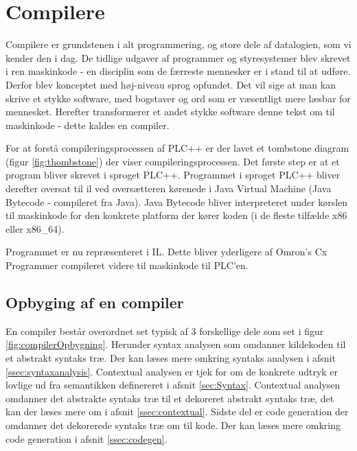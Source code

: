 \section{Compilere}
Compilere er grundstenen i alt programmering, og store dele af datalogien, som vi kender den i dag. De tidlige udgaver af programmer og styresystemer blev skrevet i ren maskinkode - en disciplin som de færreste mennesker er i stand til at udføre. Derfor blev konceptet med høj-niveau sprog opfundet. Det vil sige at man kan skrive et stykke software, med bogstaver og ord som er væsentligt mere læsbar for mennesket. Herefter transformerer et andet stykke software denne tekst om til maskinkode - dette kaldes en compiler.

For at forstå compileringsprocessen af PLC++ er der lavet et tombstone diagram (figur \ref{fig:thombstone}) der viser compileringsprocessen. Det første step er at et program bliver skrevet i sproget PLC++. Programmet i sproget PLC++ bliver derefter oversat til \gls{il} ved oversætteren kørenede i Java Virtual Machine (Java Bytecode - compileret fra Java). Java Bytecode bliver interpreteret under kørslen til maskinkode for den konkrete platform der kører koden (i de fleste tilfælde x86 eller x86\_64).

Programmet er nu repræsenteret i IL. Dette bliver yderligere af Omron's Cx Programmer compileret videre til maskinkode til PLC'en.


\subsection{Opbyging af en compiler}
En compiler består overordnet set typisk af 3 forskellige dele som set i figur \ref{fig:compilerOpbygning}. Herunder syntax analysen som omdanner kildekoden til et abstrakt syntaks træ. Der kan læses mere omkring syntaks analysen i afsnit \ref{ssec:syntaxanalysis}. Contextual analysen er tjek for om de konkrete udtryk er lovlige ud fra semantikken definereret i afsnit \ref{sec:Syntax}. Contextual analysen omdanner det abstrakte syntaks træ til et dekoreret abstrakt syntaks træ, det kan der læses mere om i afsnit \ref{ssec:contextual}. Sidste del er code generation der omdanner det dekorerede syntaks træ om til kode. Der kan læses mere omkring code generation i afsnit \ref{ssec:codegen}.

